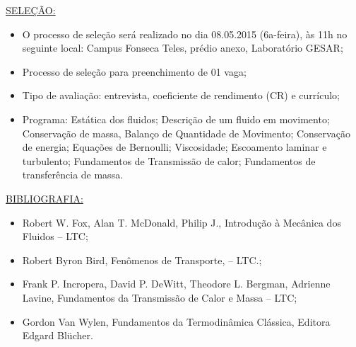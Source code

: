 \documentclass[a4paper,portuguese,12pt]{article}
\begin{document}
\vspace{1cm}

\underline{SELEÇÃO:}
\begin{itemize}
	\item O processo de seleção será realizado no dia 08.05.2015
	(6a-feira), às 11h no seguinte local: Campus Fonseca Teles, prédio
	anexo, Laboratório GESAR;
	\item Processo de seleção para preenchimento de 01 vaga;
	\item Tipo de avaliação: entrevista, coeficiente de rendimento (CR)
	e currículo;
	\item Programa: Estática dos fluidos; Descrição de um fluido em
	movimento; Conservação de massa, Balanço de Quantidade de Movimento;
	Conservação de energia; Equações de Bernoulli; Viscosidade;
	Escoamento laminar e turbulento; Fundamentos de Transmissão de
	calor; Fundamentos de transferência de massa.
\end{itemize}

\vspace{1cm}

\underline{BIBLIOGRAFIA:}
\begin{itemize}
	\item Robert W. Fox, Alan T. McDonald, Philip J., Introdução à
	Mecânica dos Fluidos -- LTC;
	\item Robert Byron Bird, Fenômenos de Transporte, -- LTC.;
	\item Frank P. Incropera, David P. DeWitt, Theodore L. Bergman,
	Adrienne Lavine, Fundamentos da Transmissão de Calor e Massa -- LTC;
	\item Gordon Van Wylen, Fundamentos da Termodinâmica Clássica,
	Editora Edgard Blücher.
\end{itemize}
\end{document}
